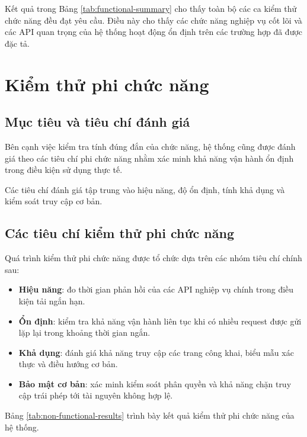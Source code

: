 Kết quả trong Bảng \ref{tab:functional-summary} cho thấy toàn bộ các ca kiểm thử chức năng đều đạt yêu cầu. Điều này cho thấy các chức năng nghiệp vụ cốt lõi và các API quan trọng của hệ thống hoạt động ổn định trên các trường hợp đã được đặc tả.

\section{Kiểm thử phi chức năng}

\subsection{Mục tiêu và tiêu chí đánh giá}

Bên cạnh việc kiểm tra tính đúng đắn của chức năng, hệ thống cũng được đánh giá theo các tiêu chí phi chức năng nhằm xác minh khả năng vận hành ổn định trong điều kiện sử dụng thực tế.

Các tiêu chí đánh giá tập trung vào hiệu năng, độ ổn định, tính khả dụng và kiểm soát truy cập cơ bản.

\subsection{Các tiêu chí kiểm thử phi chức năng}

Quá trình kiểm thử phi chức năng được tổ chức dựa trên các nhóm tiêu chí chính sau:

\begin{itemize}
    \item \textbf{Hiệu năng}: đo thời gian phản hồi của các API nghiệp vụ chính trong điều kiện tải ngắn hạn.
    
    \item \textbf{Ổn định}: kiểm tra khả năng vận hành liên tục khi có nhiều request được gửi lặp lại trong khoảng thời gian ngắn.
    
    \item \textbf{Khả dụng}: đánh giá khả năng truy cập các trang công khai, biểu mẫu xác thực và điều hướng cơ bản.
    
    \item \textbf{Bảo mật cơ bản}: xác minh kiểm soát phân quyền và khả năng chặn truy cập trái phép tới tài nguyên không hợp lệ.
\end{itemize}

Bảng \ref{tab:non-functional-results} trình bày kết quả kiểm thử phi chức năng của hệ thống.

